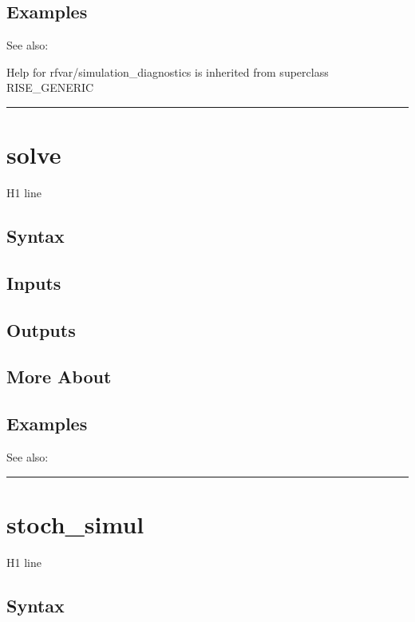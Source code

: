 \documentclass[letterpaper,10pt,english]{sphinxmanual}
\begin{document}
\subsection{Examples}
\label{classes/models/@rfvar/rfvar:id133}
See also:

Help for rfvar/simulation\_diagnostics is inherited from superclass RISE\_GENERIC


\bigskip\hrule{}\bigskip



\section{solve}
\label{classes/models/@rfvar/rfvar:id134}\label{classes/models/@rfvar/rfvar:solve}
H1 line


\subsection{Syntax}
\label{classes/models/@rfvar/rfvar:id135}

\subsection{Inputs}
\label{classes/models/@rfvar/rfvar:id136}

\subsection{Outputs}
\label{classes/models/@rfvar/rfvar:id137}

\subsection{More About}
\label{classes/models/@rfvar/rfvar:id138}

\subsection{Examples}
\label{classes/models/@rfvar/rfvar:id139}
See also:


\bigskip\hrule{}\bigskip



\section{stoch\_simul}
\label{classes/models/@rfvar/rfvar:stoch-simul}\label{classes/models/@rfvar/rfvar:id140}
H1 line


\subsection{Syntax}
\label{classes/models/@rfvar/rfvar:id141}
\end{document}
